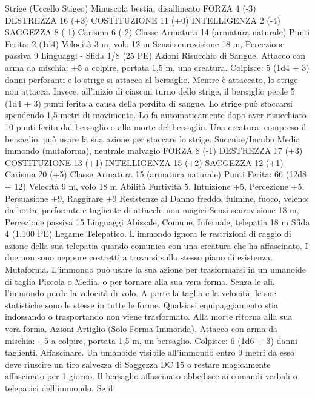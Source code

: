 \begin{multicols}{2}
Strige (Uccello Stigeo)
Minuscola bestia, disallineato
FORZA 4 (-3)
DESTREZZA 16 (+3)
COSTITUZIONE 11 (+0)
INTELLIGENZA 2 (-4)
SAGGEZZA 8 (-1)
Carisma 6 (-2)
Classe Armatura 14 (armatura naturale)
\hspace*{0pt}\hfill{Punti Ferita}: 2 (1d4)
Velocità 3 m, volo 12 m
Sensi scurovisione 18 m, Percezione passiva 9
Linguaggi -
Sfida 1/8 (25 PE)
Azioni
Risucchio di Sangue. Attacco con arma da mischia: +5 a
colpire, portata 1,5 m, una creatura.
Colpisce: 5 (1d4 + 3) danni perforanti e lo strige si attacca al
bersaglio. Mentre è attaccato, lo strige non attacca. Invece,
all’inizio di ciascun turno dello strige, il bersaglio perde 5 (1d4 +
3) punti ferita a causa della perdita di sangue.
Lo strige può staccarsi spendendo 1,5 metri di movimento. Lo fa
automaticamente dopo aver risucchiato 10 punti ferita dal
bersaglio o alla morte del bersaglio. Una creatura, compreso il
bersaglio, può usare la sua azione per staccare lo strige.
Succube/Incubo
Media immondo (mutaforma), neutrale malvagio
FORZA 8 (-1)
DESTREZZA 17 (+3)
COSTITUZIONE 13 (+1)
INTELLIGENZA 15 (+2)
SAGGEZZA 12 (+1)
Carisma 20 (+5)
Classe Armatura 15 (armatura naturale)
\hspace*{0pt}\hfill{Punti Ferita}: 66 (12d8 + 12)
Velocità 9 m, volo 18 m
Abilità Furtività 5, Intuizione +5, Percezione +5, Persuasione
+9, Raggirare +9
Resistenze al Danno freddo, fulmine, fuoco, veleno;
da botta, perforante e tagliente di attacchi non magici
Sensi scurovisione 18 m, Percezione passiva 15
Linguaggi Abissale, Comune, Infernale, telepatia 18 m
Sfida 4 (1.100 PE)
Legame Telepatico. L’immondo ignora le restrizioni di raggio di
azione della sua telepatia quando comunica con una creatura che
ha affascinato. I due non sono neppure costretti a trovarsi sullo
stesso piano di esistenza.
Mutaforma. L’immondo può usare la sua azione per trasformarsi
in un umanoide di taglia Piccola o Media, o per tornare alla sua
vera forma. Senza le ali, l’immondo perde la velocità di volo. A
parte la taglia e la velocità, le sue statistiche sono le stesse in
tutte le forme. Qualsiasi equipaggiamento stia indossando o
trasportando non viene trasformato. Alla morte ritorna alla sua
vera forma.
Azioni
Artiglio (Solo Forma Immonda). Attacco con arma da mischia:
+5 a colpire, portata 1,5 m, un bersaglio.
Colpisce: 6 (1d6 + 3) danni taglienti.
Affascinare. Un umanoide visibile all’immondo entro 9 metri da
esso deve riuscire un tiro salvezza di Saggezza DC 15 o restare
magicamente affascinato per 1 giorno. Il bersaglio affascinato
obbedisce ai comandi verbali o telepatici dell’immondo. Se il

\end{multicols}
